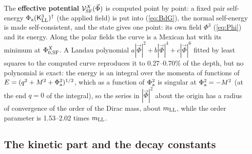 \documentclass[aps,prd,onecolumn,superscriptaddress,nofootinbib,floatfix,longbibliography]{revtex4-2}
\newcommand{\LL}{{\rm LL}}
\newcommand{\SF}{{\rm SF}}
\begin{document}
The \textbf{effective potential} $\mathcal V^X_\SF(\vec\Phi)$ is computed point by point: a fixed pair self-energy
$\Phi_{\rm a}(\mathsf K^3_\LL)^\dagger$ (the applied field) is put into (\ref{eq:BdG}), the normal self-energy is made self-consistent, and
the state gives one point: its own field $\Phi^3$ (\ref{eq:Phi}) and its energy. Along the polar fields the curve is a Mexican
hat with its minimum at $\Phi^X_{0,\SF}$. A Landau polynomial $a|\vec\Phi|^2+b|\vec\Phi|^4+c|\vec\Phi|^6$ fitted by least squares to
the computed curve reproduces it to 0.27\mbox{--}0.70\% of the depth, but no polynomial is exact: the energy is an integral over
the momenta of functions of $E=(q^2+M^2+\Phi_{\rm a}^2)^{1/2}$, which as a function of $\Phi_{\rm a}^2$ is singular at
$\Phi_{\rm a}^2=-M^2$ (at the end $q=0$ of the integral), so the series in $|\vec\Phi|^2$ about the origin has a radius of
convergence of the order of the Dirac mass, about $m_\LL$, while the order parameter is 1.53\mbox{--}2.02 times $m_\LL$.

\subsection{The kinetic part and the decay constants}
\end{document}
